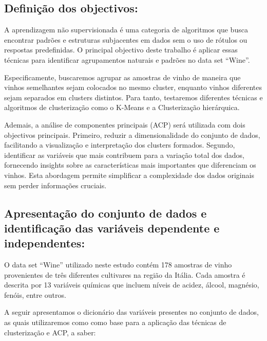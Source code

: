 \documentclass[
  letterpaper,
  DIV=11,
  numbers=noendperiod]{scrartcl}
\begin{document}
\subsection{Definição dos
objectivos:}\label{definiuxe7uxe3o-dos-objectivos}

A aprendizagem não supervisionada é uma categoria de algoritmos que
busca encontrar padrões e estruturas subjacentes em dados sem o uso de
rótulos ou respostas predefinidas. O principal objectivo deste trabalho
é aplicar essas técnicas para identificar agrupamentos naturais e
padrões no data set ``Wine''.

Especificamente, buscaremos agrupar as amostras de vinho de maneira que
vinhos semelhantes sejam colocados no mesmo cluster, enquanto vinhos
diferentes sejam separados em clusters distintos. Para tanto, testaremos
diferentes técnicas e algoritmos de clusterização como o K-Means e a
Clusterização hierárquica.

Ademais, a análise de componentes principais (ACP) será utilizada com
dois objectivos principais. Primeiro, reduzir a dimensionalidade do
conjunto de dados, facilitando a visualização e interpretação dos
clusters formados. Segundo, identificar as variáveis que mais contribuem
para a variação total dos dados, fornecendo insights sobre as
características mais importantes que diferenciam os vinhos. Esta
abordagem permite simplificar a complexidade dos dados originais sem
perder informações cruciais.

\subsection{Apresentação do conjunto de dados e identificação das
variáveis dependente e
independentes:}\label{apresentauxe7uxe3o-do-conjunto-de-dados-e-identificauxe7uxe3o-das-variuxe1veis-dependente-e-independentes}

O data set ``Wine'' utilizado neste estudo contém 178 amostras de vinho
provenientes de três diferentes cultivares na região da Itália. Cada
amostra é descrita por 13 variáveis químicas que incluem níveis de
acidez, álcool, magnésio, fenóis, entre outros.

A seguir apresentamos o dicionário das variáveis presentes no conjunto
de dados, as quais utilizaremos como como base para a aplicação das
técnicas de clusterização e ACP, a saber:
\end{document}

